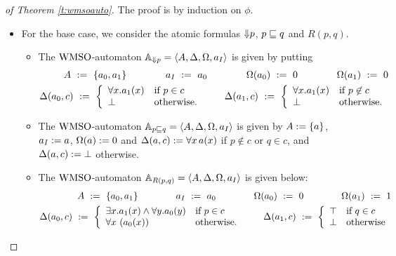 \begin{proof}[of Theorem \ref{t:wmsoauto}] The proof is by induction on $\phi$.
\begin{itemize}

\item 
For the base case, we consider the atomic formulas ${\Downarrow}p$, $p \sqsubseteq q$ and 
$R(p,q)$.

\begin{itemize}
\item
The $\mathrm{WMSO}$-automaton $\mathbb{A}_{{\Downarrow}p} = \langle{A,\Delta,\Omega,a_I}\rangle$ is given 
by putting
\begin{eqnarray*}
        A  \  \mathrel{: =} \  \{a_0,a_1\}  \qquad \qquad  
	a_I  \   \mathrel{: =}  \  a_0      \qquad \qquad   
	\Omega(a_0)  \  \mathrel{: =} \  0  \qquad \qquad
        \Omega(a_1)  \  \mathrel{: =} \  0 
\\ \Delta(a_0,c)  \  \mathrel{: =} \  \left\{
	\begin{array}{ll}
           \forall x. a_1(x)  &  \mbox{if } p \in c
	\\ \bot               &  \mbox{otherwise.}
	\end{array}
\right. \qquad 
  \Delta(a_1,c)  \  \mathrel{: =} \  \left\{
	\begin{array}{ll}
           \forall x. a_1(x)  &  \mbox{if } p \not\in c
	\\ \bot &  \mbox{otherwise.}
	\end{array}
\right.
\end{eqnarray*}
\item
The $\mathrm{WMSO}$-automaton $\mathbb{A}_{p\sqsubseteq q} = \langle{A,\Delta,\Omega,a_I}\rangle$ is given by
$A \mathrel{:=} \{ a \}$, $a_{I} \mathrel{:=} a$, $\Omega(a) \mathrel{:=} 0$ and 
$\Delta(a,c) \mathrel{:=} \forall x\, a(x)$ if $p \not\in c$ or $q\in c$, and
$\Delta(a,c) \mathrel{:=} \bot$ otherwise.

\item
The $\mathrm{WMSO}$-automaton $\mathbb{A}_{R(p,q)} = \langle{A,\Delta,\Omega,a_I}\rangle$ is given below:
\begin{eqnarray*}
        A  \  \mathrel{: =} \  \{a_0,a_1\}  \qquad \qquad  
	a_I  \   \mathrel{: =}  \  a_0      \qquad \qquad   
	\Omega(a_0)  \  \mathrel{: =} \  0  \qquad \qquad
        \Omega(a_1)  \  \mathrel{: =} \  1 
\\ \Delta(a_0,c)  \  \mathrel{: =} \  \left\{
	\begin{array}{ll}
           \exists x. a_1(x) \wedge \forall y. a_0(y)  &  \mbox{if }p \in c
	\\ \forall x\ (a_0(x))  &  \mbox{otherwise.}
	\end{array}
\right. \qquad 
  \Delta(a_1,c)  \  \mathrel{: =} \  \left\{
	\begin{array}{ll}
        \top  &  \mbox{if }q \in c \\
        \bot  &  \mbox{otherwise}
	\end{array}
\right.
\end{eqnarray*}
\end{itemize}


\end{itemize}
\end{proof}
